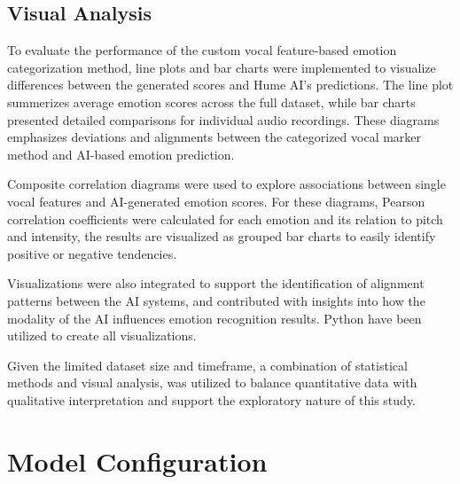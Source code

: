 \subsection{Visual Analysis}

To evaluate the performance of the custom vocal feature-based emotion categorization method, line plots and bar charts were implemented to visualize differences between the generated scores and Hume AI's predictions. 
The line plot summerizes average emotion scores across the full dataset, while bar charts presented detailed comparisons for individual audio recordings. 
These diagrams emphasizes deviations and alignments between the categorized vocal marker method and AI-based emotion prediction. 

Composite correlation diagrams were used to explore associations between single vocal features and AI-generated emotion scores. 
For these diagrams, Pearson correlation coefficients were calculated for each emotion and its relation to pitch and intensity, the results are visualized as grouped bar charts to easily identify positive or negative tendencies. 

Visualizations were also integrated to support the identification of alignment patterns between the AI systems, and contributed with insights into how the modality of the AI influences emotion recognition results. 
Python have been utilized to create all visualizations. 

Given the limited dataset size and timeframe, a combination of statistical methods and visual analysis, was utilized to balance quantitative data with qualitative interpretation and support the exploratory nature of this study. 

\section{Model Configuration}
